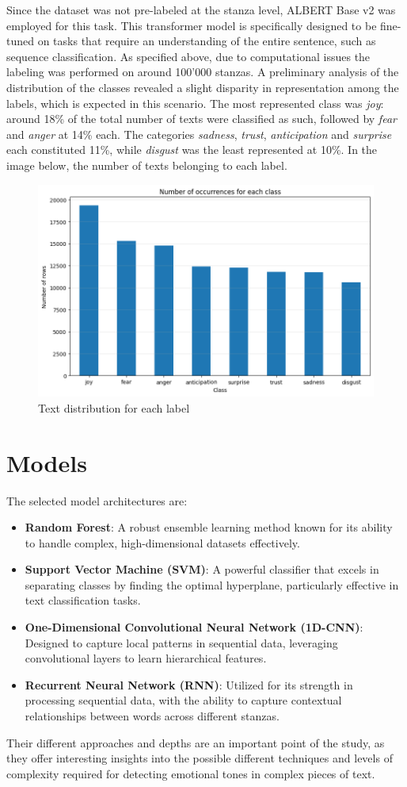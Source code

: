 Since the dataset was not pre-labeled at the stanza level, ALBERT Base v2 was employed for this task.
This transformer model is specifically designed to be fine-tuned on tasks that
require an understanding of the entire sentence, such as sequence classification. As specified above, due to computational issues the labeling was performed on around 100'000 stanzas. 
A preliminary analysis of the distribution of the classes revealed a slight disparity in representation among the labels, which is expected in this scenario. 
The most represented class was \textit{joy}: around 18\% of the total number of texts were classified as such, followed by \textit{fear} and \textit{anger} at 14\% each. 
The categories \textit{sadness}, \textit{trust}, \textit{anticipation} and \textit{surprise} each constituted 11\%, while \textit{disgust} was the least represented at 10\%. In the image below, the number of texts belonging to each label.  
\begin{figure}
    \centering
    \includegraphics[width=0.5\linewidth]{pictures/exploratory_graph.png}
    \caption{Text distribution for each label}
    \label{fig:enter-label}
\end{figure}

\section*{Models}
The selected model architectures are:
\begin{itemize} 
    \item \textbf{Random Forest}: A robust ensemble learning method known for
    its ability to handle complex, high-dimensional datasets effectively.
    \item \textbf{Support Vector Machine (SVM)}: A powerful classifier that
    excels in separating classes by finding the optimal hyperplane,
    particularly effective in text classification tasks.
    \item \textbf{One-Dimensional Convolutional Neural Network (1D-CNN)}:
    Designed to capture local patterns in sequential data, leveraging
    convolutional layers to learn hierarchical features.
    \item \textbf{Recurrent Neural Network (RNN)}: Utilized for its strength
    in processing sequential data, with the ability to capture contextual
    relationships between words across different stanzas.
\end{itemize}
Their different approaches and depths are an important point of the study, as they
offer interesting insights into the possible different techniques and levels of
complexity required for detecting emotional tones in complex pieces of text.

